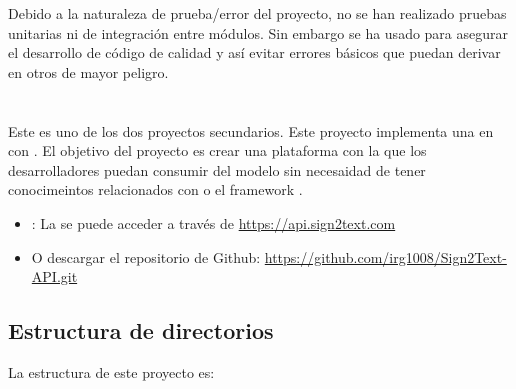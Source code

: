 Debido a la naturaleza de prueba/error del proyecto, no se han realizado pruebas unitarias ni de integración entre módulos. Sin embargo se ha usado  para asegurar el desarrollo de código de calidad y así evitar errores básicos que puedan derivar en otros de mayor peligro.


\section{}

Este es uno de los dos proyectos secundarios. Este proyecto implementa una  en  con . El objetivo del proyecto es crear una plataforma con la que los desarrolladores puedan consumir del modelo sin necesaidad de tener conocimeintos relacionados con  o el framework .

\begin{itemize}
  \item {}: La  se puede acceder a través de \url{https://api.sign2text.com}
  \item O descargar el repositorio de Github: \url{https://github.com/irg1008/Sign2Text-API.git}
\end{itemize}


\subsection{Estructura de directorios}

La estructura de este proyecto es:

